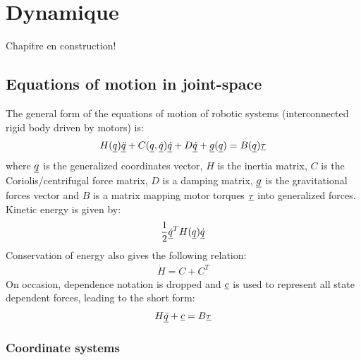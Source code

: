 \chapter{Dynamique}
\label{sec:dynamic}

Chapitre en construction!


\section{Equations of motion in joint-space}
\label{sec:eom}

The general form of the equations of motion of robotic systems (interconnected rigid body driven by motors) is:
%
\begin{align}
	H(\underline{q}) \underline{\ddot{q}} + C(\underline{q},\underline{\dot{q}}) \underline{\dot{q}} + D \underline{\dot{q}} + \underline{g}(\underline{q}) = B(\underline{q}) \underline{\tau}
	\label{eq:manipulator}
\end{align}
%
where $\underline{q}$ is the generalized coordinates vector, $H$ is the inertia matrix, $C$ is the Coriolis/centrifugal force matrix, $D$ is a damping matrix, $\underline{g}$ is the gravitational forces vector and $B$ is a matrix mapping motor torques $\underline{\tau}$ into generalized forces.
%
Kinetic energy is given by:
%
\begin{align}
	\frac{1}{2} \underline{\dot{q}}^T H(\underline{q}) \underline{\dot{q}}
	\label{eq:kinetic}
\end{align}
%
Conservation of energy also gives the following relation:
%
\begin{align}
	\dot{H} = C + C^T
	\label{eq:cener}
\end{align}
%
On occasion, dependence notation is dropped and $\underline{c}$ is used to represent all state dependent forces, leading to the short form:
%
\begin{align}
	H \underline{\ddot{q}} + \underline{c} = B \underline{\tau}
	\label{eq:manipulator_short}
\end{align}

\subsection{Coordinate systems}
\label{sec:coord}

